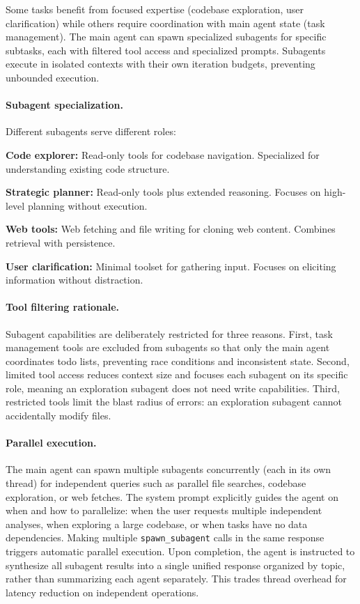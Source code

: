 Some tasks benefit from focused expertise (codebase exploration, user clarification) while others require coordination with main agent state (task management). The main agent can spawn specialized subagents for specific subtasks, each with filtered tool access and specialized prompts. Subagents execute in isolated contexts with their own iteration budgets, preventing unbounded execution.

\paragraph{Subagent specialization.} Different subagents serve different roles:

\begin{packeditemize}
\item \textbf{Code explorer:} Read-only tools for codebase navigation. Specialized for understanding existing code structure.
\item \textbf{Strategic planner:} Read-only tools plus extended reasoning. Focuses on high-level planning without execution.
\item \textbf{Web tools:} Web fetching and file writing for cloning web content. Combines retrieval with persistence.
\item \textbf{User clarification:} Minimal toolset for gathering input. Focuses on eliciting information without distraction.
\end{packeditemize}

\paragraph{Tool filtering rationale.} Subagent capabilities are deliberately restricted for three reasons. First, task management tools are excluded from subagents so that only the main agent coordinates todo lists, preventing race conditions and inconsistent state. Second, limited tool access reduces context size and focuses each subagent on its specific role, meaning an exploration subagent does not need write capabilities. Third, restricted tools limit the blast radius of errors: an exploration subagent cannot accidentally modify files.

\paragraph{Parallel execution.} The main agent can spawn multiple subagents concurrently (each in its own thread) for independent queries such as parallel file searches, codebase exploration, or web fetches. The system prompt explicitly guides the agent on when and how to parallelize: when the user requests multiple independent analyses, when exploring a large codebase, or when tasks have no data dependencies. Making multiple \texttt{spawn\_subagent} calls in the same response triggers automatic parallel execution. Upon completion, the agent is instructed to synthesize all subagent results into a single unified response organized by topic, rather than summarizing each agent separately. This trades thread overhead for latency reduction on independent operations.

